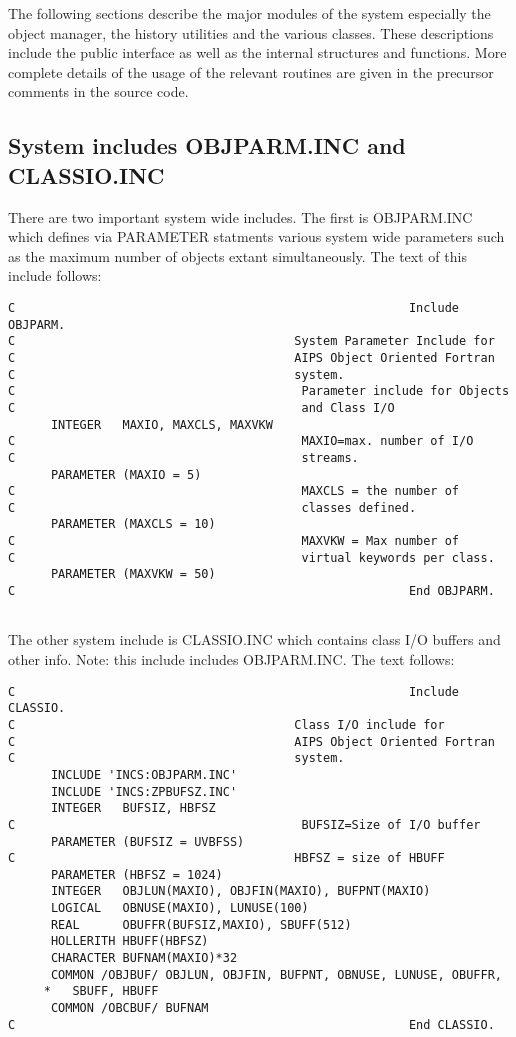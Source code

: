    The following sections describe the major modules of the system
especially the object manager, the history utilities and the various
classes.  These descriptions include the public interface as well as
the internal structures and functions.  More complete details of the
usage of the relevant routines are given in the precursor comments in
the source code.

\subsection{System includes OBJPARM.INC and CLASSIO.INC}

   There are two important system wide includes.  The first is
OBJPARM.INC which defines via PARAMETER statments various system wide
parameters such as the maximum number of objects extant
simultaneously.  The text of this include follows:
{\small\begin{verbatim}
C                                                       Include OBJPARM.
C                                       System Parameter Include for
C                                       AIPS Object Oriented Fortran
C                                       system.
C                                        Parameter include for Objects
C                                        and Class I/O
      INTEGER   MAXIO, MAXCLS, MAXVKW
C                                        MAXIO=max. number of I/O
C                                        streams.
      PARAMETER (MAXIO = 5)
C                                        MAXCLS = the number of
C                                        classes defined.
      PARAMETER (MAXCLS = 10)
C                                        MAXVKW = Max number of
C                                        virtual keywords per class.
      PARAMETER (MAXVKW = 50)
C                                                       End OBJPARM.


\end{verbatim}}


   The other system include is CLASSIO.INC which contains class I/O
buffers and other info. Note: this include includes OBJPARM.INC. The
text follows:
{\small\begin{verbatim}
C                                                       Include CLASSIO.
C                                       Class I/O include for
C                                       AIPS Object Oriented Fortran
C                                       system.
      INCLUDE 'INCS:OBJPARM.INC'
      INCLUDE 'INCS:ZPBUFSZ.INC'
      INTEGER   BUFSIZ, HBFSZ
C                                        BUFSIZ=Size of I/O buffer
      PARAMETER (BUFSIZ = UVBFSS)
C                                       HBFSZ = size of HBUFF
      PARAMETER (HBFSZ = 1024)
      INTEGER   OBJLUN(MAXIO), OBJFIN(MAXIO), BUFPNT(MAXIO)
      LOGICAL   OBNUSE(MAXIO), LUNUSE(100)
      REAL      OBUFFR(BUFSIZ,MAXIO), SBUFF(512)
      HOLLERITH HBUFF(HBFSZ)
      CHARACTER BUFNAM(MAXIO)*32
      COMMON /OBJBUF/ OBJLUN, OBJFIN, BUFPNT, OBNUSE, LUNUSE, OBUFFR,
     *   SBUFF, HBUFF
      COMMON /OBCBUF/ BUFNAM
C                                                       End CLASSIO.

\end{verbatim}}

